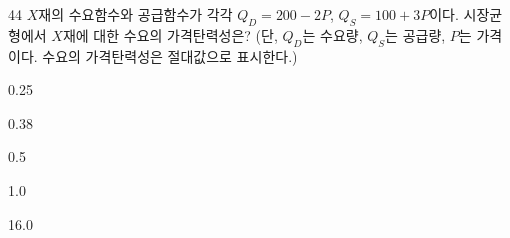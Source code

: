 \begin{question}{44}
$X$재의 수요함수와 공급함수가 각각 $Q_{D}=200-2P$, $Q_{S}=100+3P$이다. 시장균형에서 $X$재에 대한 수요의 가격탄력성은? (단, $Q_{D}$는 수요량, $Q_{S}$는 공급량, $P$는 가격이다. 수요의 가격탄력성은 절대값으로 표시한다.)
\begin{choices}
  \item 0.25
  \item 0.38
  \item 0.5
  \item 1.0
  \item 16.0
\end{choices}
\end{question}
